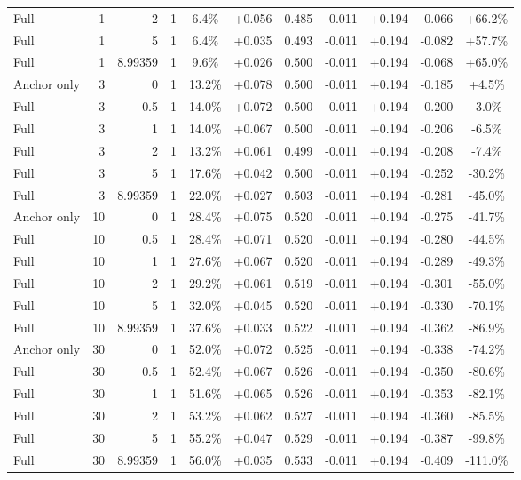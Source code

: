 \begin{table}[htbp]
\begin{tabular}{lrrrccccccc}
Full & 1 & 2 & 1 & 6.4\% & +0.056 & 0.485 & -0.011 & +0.194 & -0.066 & +66.2\% \\
Full & 1 & 5 & 1 & 6.4\% & +0.035 & 0.493 & -0.011 & +0.194 & -0.082 & +57.7\% \\
Full & 1 & 8.99359 & 1 & 9.6\% & +0.026 & 0.500 & -0.011 & +0.194 & -0.068 & +65.0\% \\
Anchor only & 3 & 0 & 1 & 13.2\% & +0.078 & 0.500 & -0.011 & +0.194 & -0.185 & +4.5\% \\
Full & 3 & 0.5 & 1 & 14.0\% & +0.072 & 0.500 & -0.011 & +0.194 & -0.200 & -3.0\% \\
Full & 3 & 1 & 1 & 14.0\% & +0.067 & 0.500 & -0.011 & +0.194 & -0.206 & -6.5\% \\
Full & 3 & 2 & 1 & 13.2\% & +0.061 & 0.499 & -0.011 & +0.194 & -0.208 & -7.4\% \\
Full & 3 & 5 & 1 & 17.6\% & +0.042 & 0.500 & -0.011 & +0.194 & -0.252 & -30.2\% \\
Full & 3 & 8.99359 & 1 & 22.0\% & +0.027 & 0.503 & -0.011 & +0.194 & -0.281 & -45.0\% \\
Anchor only & 10 & 0 & 1 & 28.4\% & +0.075 & 0.520 & -0.011 & +0.194 & -0.275 & -41.7\% \\
Full & 10 & 0.5 & 1 & 28.4\% & +0.071 & 0.520 & -0.011 & +0.194 & -0.280 & -44.5\% \\
Full & 10 & 1 & 1 & 27.6\% & +0.067 & 0.520 & -0.011 & +0.194 & -0.289 & -49.3\% \\
Full & 10 & 2 & 1 & 29.2\% & +0.061 & 0.519 & -0.011 & +0.194 & -0.301 & -55.0\% \\
Full & 10 & 5 & 1 & 32.0\% & +0.045 & 0.520 & -0.011 & +0.194 & -0.330 & -70.1\% \\
Full & 10 & 8.99359 & 1 & 37.6\% & +0.033 & 0.522 & -0.011 & +0.194 & -0.362 & -86.9\% \\
Anchor only & 30 & 0 & 1 & 52.0\% & +0.072 & 0.525 & -0.011 & +0.194 & -0.338 & -74.2\% \\
Full & 30 & 0.5 & 1 & 52.4\% & +0.067 & 0.526 & -0.011 & +0.194 & -0.350 & -80.6\% \\
Full & 30 & 1 & 1 & 51.6\% & +0.065 & 0.526 & -0.011 & +0.194 & -0.353 & -82.1\% \\
Full & 30 & 2 & 1 & 53.2\% & +0.062 & 0.527 & -0.011 & +0.194 & -0.360 & -85.5\% \\
Full & 30 & 5 & 1 & 55.2\% & +0.047 & 0.529 & -0.011 & +0.194 & -0.387 & -99.8\% \\
Full & 30 & 8.99359 & 1 & 56.0\% & +0.035 & 0.533 & -0.011 & +0.194 & -0.409 & -111.0\% \\

\end{tabular}
\end{table}
